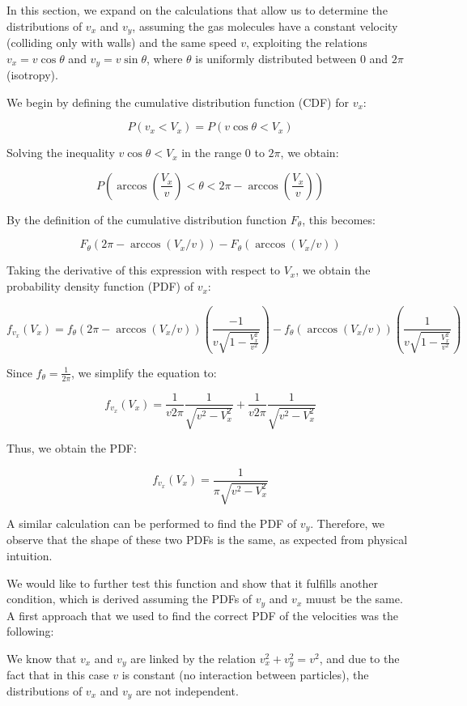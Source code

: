 \documentclass{article}
\begin{document}
In this section, we expand on the calculations that allow us to determine the distributions of \(v_x\) and \(v_y\), assuming the gas molecules have a constant velocity (colliding only with walls) and the same speed \(v\), exploiting the relations \(v_x = v \cos \theta\) and \(v_y = v \sin \theta\), where \(\theta\) is uniformly distributed between 0 and \(2\pi\) (isotropy).

We begin by defining the cumulative distribution function (CDF) for \(v_x\):

\[
P(v_x < V_x) = P(v \cos \theta < V_x)
\]

Solving the inequality \(v \cos \theta < V_x\) in the range \(0\) to \(2\pi\), we obtain:

\[
P\left(\arccos\left(\frac{V_x}{v}\right) < \theta < 2\pi - \arccos\left(\frac{V_x}{v}\right)\right)
\]

By the definition of the cumulative distribution function \(F_\theta\), this becomes:

\[
F_\theta(2\pi - \arccos(V_x/v)) - F_\theta(\arccos(V_x/v))
\]

Taking the derivative of this expression with respect to \(V_x\), we obtain the probability density function (PDF) of \(v_x\):

\[
f_{v_x}(V_x) = f_\theta(2\pi - \arccos(V_x/v)) \left(\frac{-1}{v \sqrt{1 - \frac{V_x^2}{v^2}}}\right) - f_\theta(\arccos(V_x/v)) \left(\frac{1}{v \sqrt{1 - \frac{V_x^2}{v^2}}}\right)
\]

Since \(f_\theta = \frac{1}{2\pi}\), we simplify the equation to:

\[
f_{v_x}(V_x) = \frac{1}{v 2\pi} \frac{1}{\sqrt{v^2 - V_x^2}} + \frac{1}{v 2\pi} \frac{1}{\sqrt{v^2 - V_x^2}}
\]

Thus, we obtain the PDF:

\[
f_{v_x}(V_x) = \frac{1}{\pi \sqrt{v^2 - V_x^2}}
\]

A similar calculation can be performed to find the PDF of \(v_y\). Therefore, we observe that the shape of these two PDFs is the same, as expected from physical intuition.


We would like to further test this function and show that it fulfills another condition, which is derived assuming the PDFs of \(v_y\) and \(v_x\) muust be the same. 
A first approach that we used to find the correct PDF of the velocities was the following:

We know that \(v_x\) and \(v_y\) are linked by the relation \(v_x^2 + v_y^2 = v^2\), and due to the fact that in this case \(v\) is constant (no interaction between particles), the distributions of \(v_x\) and \(v_y\) are not independent.
\end{document}

